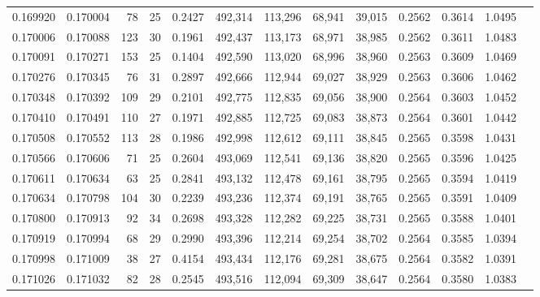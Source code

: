 \begin{tabular}{rrrrrrrrrrrrr}
0.169920 & 0.170004 &    78 &  25 &                                     0.2427 & 492,314 & 113,296 &  68,941 &  39,015 & 0.2562 & 0.3614 & 1.0495 \\
0.170006 & 0.170088 &   123 &  30 &                                     0.1961 & 492,437 & 113,173 &  68,971 &  38,985 & 0.2562 & 0.3611 & 1.0483 \\
0.170091 & 0.170271 &   153 &  25 &                                     0.1404 & 492,590 & 113,020 &  68,996 &  38,960 & 0.2563 & 0.3609 & 1.0469 \\
0.170276 & 0.170345 &    76 &  31 &                                     0.2897 & 492,666 & 112,944 &  69,027 &  38,929 & 0.2563 & 0.3606 & 1.0462 \\
0.170348 & 0.170392 &   109 &  29 &                                     0.2101 & 492,775 & 112,835 &  69,056 &  38,900 & 0.2564 & 0.3603 & 1.0452 \\
0.170410 & 0.170491 &   110 &  27 &                                     0.1971 & 492,885 & 112,725 &  69,083 &  38,873 & 0.2564 & 0.3601 & 1.0442 \\
0.170508 & 0.170552 &   113 &  28 &                                     0.1986 & 492,998 & 112,612 &  69,111 &  38,845 & 0.2565 & 0.3598 & 1.0431 \\
0.170566 & 0.170606 &    71 &  25 &                                     0.2604 & 493,069 & 112,541 &  69,136 &  38,820 & 0.2565 & 0.3596 & 1.0425 \\
0.170611 & 0.170634 &    63 &  25 &                                     0.2841 & 493,132 & 112,478 &  69,161 &  38,795 & 0.2565 & 0.3594 & 1.0419 \\
0.170634 & 0.170798 &   104 &  30 &                                     0.2239 & 493,236 & 112,374 &  69,191 &  38,765 & 0.2565 & 0.3591 & 1.0409 \\
0.170800 & 0.170913 &    92 &  34 &                                     0.2698 & 493,328 & 112,282 &  69,225 &  38,731 & 0.2565 & 0.3588 & 1.0401 \\
0.170919 & 0.170994 &    68 &  29 &                                     0.2990 & 493,396 & 112,214 &  69,254 &  38,702 & 0.2564 & 0.3585 & 1.0394 \\
0.170998 & 0.171009 &    38 &  27 &                                     0.4154 & 493,434 & 112,176 &  69,281 &  38,675 & 0.2564 & 0.3582 & 1.0391 \\
0.171026 & 0.171032 &    82 &  28 &                                     0.2545 & 493,516 & 112,094 &  69,309 &  38,647 & 0.2564 & 0.3580 & 1.0383 \\

\end{tabular}
